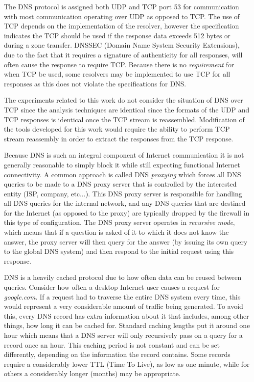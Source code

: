 \documentclass[12pt]{report}
\theoremstyle{remark}
\theoremstyle{definition}
\theoremstyle{definition}
\theoremstyle{definition}
\begin{document}
The DNS protocol is assigned both UDP and TCP port 53 for
communication with most communication operating over UDP as opposed to TCP. The
use of TCP depends on the implementation of the resolver, however the
specification indicates the TCP should be used if the response data exceeds 512
bytes or during a zone transfer\cite{rfc1035}. DNSSEC (Domain Name System
Security Extensions), due to the fact that it requires a signature of
authenticity for all responses, will often cause the response to
require TCP\cite{rfc4034}. 
Because there is no \emph{requirement} for when
TCP be used, some resolvers may be implemented to use TCP for all responses as
this does not violate the specifications for DNS.

The experiments related to this work do not consider the situation of DNS over
TCP since the analysis techniques are identical since the formats of the UDP
and TCP responses is identical once the TCP stream is reassembled. Modification
of the tools developed for this work would require the ability to perform TCP
stream reassembly in order to extract the responses from the TCP response.

Because DNS is such an integral component of Internet communication it is not
generally reasonable to simply block it while still expecting functional Internet
connectivity. A common approach is called DNS \emph{proxying} which
forces all DNS queries to be made to a DNS proxy server that is controlled by
the interested entity (ISP, company, etc...). This DNS proxy server is
responsible for handling all DNS queries for the internal network, and any DNS
queries that are destined for the Internet (as opposed to the proxy) are
typically dropped by the
firewall in this type of configuration. The DNS proxy server operates in
\emph{recursive mode}, which means that if a question is asked of it to which
it does not know the answer, the proxy server will then query for the answer (by 
issuing its own query to the global DNS system) and then respond to the initial
request using this response.

DNS is a heavily cached protocol due to how often data can be reused between
queries. Consider how often a desktop Internet user causes a request for
\emph{google.com}. If a request had to traverse the entire DNS system every
time, this would represent a very considerable amount of traffic being
generated. To avoid this, every DNS record has extra information about it that
includes, among other things, how long it can be cached for. Standard
caching lengths put it around one hour which means that a DNS server will only
recursively pass on a query for a record once an hour. This caching period is
not constant and can be set differently, depending on the information the
record contains. Some records require a considerably lower TTL (Time To Live),
as low as one minute, while for others a considerably longer (months) may be
appropriate.
\end{document}
